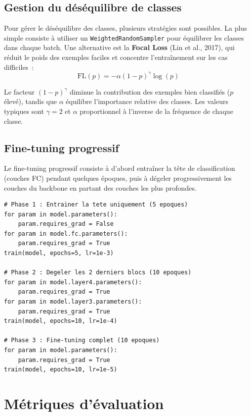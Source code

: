 \documentclass[a4paper,11pt,twoside]{book}
\begin{document}
\subsection{Gestion du déséquilibre de classes}

Pour gérer le déséquilibre des classes, plusieurs stratégies sont possibles. La plus simple consiste à utiliser un \texttt{WeightedRandomSampler} pour équilibrer les classes dans chaque batch. Une alternative est la \textbf{Focal Loss} (Lin et al., 2017), qui réduit le poids des exemples faciles et concentre l'entraînement sur les cas difficiles~:
\[
\text{FL}(p) = -\alpha (1-p)^\gamma \log(p)
\]

Le facteur $(1-p)^\gamma$ diminue la contribution des exemples bien classifiés ($p$ élevé), tandis que $\alpha$ équilibre l'importance relative des classes. Les valeurs typiques sont $\gamma = 2$ et $\alpha$ proportionnel à l'inverse de la fréquence de chaque classe.

\subsection{Fine-tuning progressif}

Le fine-tuning progressif consiste à d'abord entraîner la tête de classification (couches FC) pendant quelques époques, puis à dégeler progressivement les couches du backbone en partant des couches les plus profondes.

\begin{lstlisting}[caption={Fine-tuning progressif en trois phases}]
# Phase 1 : Entrainer la tete uniquement (5 epoques)
for param in model.parameters():
    param.requires_grad = False
for param in model.fc.parameters():
    param.requires_grad = True
train(model, epochs=5, lr=1e-3)

# Phase 2 : Degeler les 2 derniers blocs (10 epoques)
for param in model.layer4.parameters():
    param.requires_grad = True
for param in model.layer3.parameters():
    param.requires_grad = True
train(model, epochs=10, lr=1e-4)

# Phase 3 : Fine-tuning complet (10 epoques)
for param in model.parameters():
    param.requires_grad = True
train(model, epochs=10, lr=1e-5)
\end{lstlisting}

\section{Métriques d'évaluation}
\end{document}
